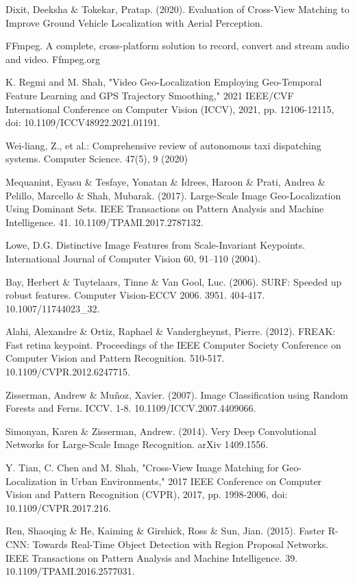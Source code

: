 \documentclass[10pt,letterpaper]{article}
\begin{document}
\begin{thebibliography}{10}
  Dixit, Deeksha \& Tokekar, Pratap. (2020). Evaluation of Cross-View Matching to Improve Ground Vehicle Localization with Aerial Perception. 
  
  FFmpeg. A complete, cross-platform solution to record, convert and stream audio and video. Ffmpeg.org
  
   K. Regmi and M. Shah, "Video Geo-Localization Employing Geo-Temporal Feature Learning and GPS Trajectory Smoothing," 2021 IEEE/CVF International Conference on Computer Vision (ICCV), 2021, pp. 12106-12115, doi: 10.1109/ICCV48922.2021.01191.
  
   Wei‐liang, Z., et al.: Comprehensive review of autonomous taxi dispatching systems. Computer Science. 47(5), 9 (2020)
  
  Mequanint, Eyasu \& Tesfaye, Yonatan \& Idrees, Haroon \& Prati, Andrea \& Pelillo, Marcello \& Shah, Mubarak. (2017). Large-Scale Image Geo-Localization Using Dominant Sets. IEEE Transactions on Pattern Analysis and Machine Intelligence. 41. 10.1109/TPAMI.2017.2787132. 
  
  Lowe, D.G. Distinctive Image Features from Scale-Invariant Keypoints. International Journal of Computer Vision 60, 91–110 (2004).
  
  Bay, Herbert \& Tuytelaars, Tinne \& Van Gool, Luc. (2006). SURF: Speeded up robust features. Computer Vision-ECCV 2006. 3951. 404-417. 10.1007/11744023\_32. 
  
  Alahi, Alexandre \& Ortiz, Raphael \& Vandergheynst, Pierre. (2012). FREAK: Fast retina keypoint. Proceedings of the IEEE Computer Society Conference on Computer Vision and Pattern Recognition. 510-517. 10.1109/CVPR.2012.6247715. 
  
  Zisserman, Andrew \& Muñoz, Xavier. (2007). Image Classification using Random Forests and Ferns. ICCV. 1-8. 10.1109/ICCV.2007.4409066. 
  
  Simonyan, Karen \& Zisserman, Andrew. (2014). Very Deep Convolutional Networks for Large-Scale Image Recognition. arXiv 1409.1556. 
  
  Y. Tian, C. Chen and M. Shah, "Cross-View Image Matching for Geo-Localization in Urban Environments," 2017 IEEE Conference on Computer Vision and Pattern Recognition (CVPR), 2017, pp. 1998-2006, doi: 10.1109/CVPR.2017.216.
  
  Ren, Shaoqing \& He, Kaiming \& Girshick, Ross \& Sun, Jian. (2015). Faster R-CNN: Towards Real-Time Object Detection with Region Proposal Networks. IEEE Transactions on Pattern Analysis and Machine Intelligence. 39. 10.1109/TPAMI.2016.2577031. 
  

\end{thebibliography}
\end{document}
